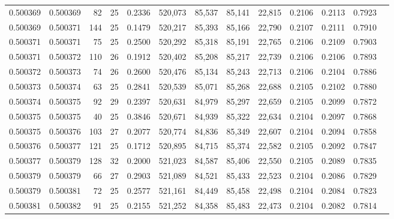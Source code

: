 \begin{tabular}{rrrrrrrrrrrrr}
0.500369 & 0.500369 &  82 &  25 &                                     0.2336 & 520,073 &  85,537 &  85,141 &  22,815 & 0.2106 & 0.2113 & 0.7923 \\
0.500369 & 0.500371 & 144 &  25 &                                     0.1479 & 520,217 &  85,393 &  85,166 &  22,790 & 0.2107 & 0.2111 & 0.7910 \\
0.500371 & 0.500371 &  75 &  25 &                                     0.2500 & 520,292 &  85,318 &  85,191 &  22,765 & 0.2106 & 0.2109 & 0.7903 \\
0.500371 & 0.500372 & 110 &  26 &                                     0.1912 & 520,402 &  85,208 &  85,217 &  22,739 & 0.2106 & 0.2106 & 0.7893 \\
0.500372 & 0.500373 &  74 &  26 &                                     0.2600 & 520,476 &  85,134 &  85,243 &  22,713 & 0.2106 & 0.2104 & 0.7886 \\
0.500373 & 0.500374 &  63 &  25 &                                     0.2841 & 520,539 &  85,071 &  85,268 &  22,688 & 0.2105 & 0.2102 & 0.7880 \\
0.500374 & 0.500375 &  92 &  29 &                                     0.2397 & 520,631 &  84,979 &  85,297 &  22,659 & 0.2105 & 0.2099 & 0.7872 \\
0.500375 & 0.500375 &  40 &  25 &                                     0.3846 & 520,671 &  84,939 &  85,322 &  22,634 & 0.2104 & 0.2097 & 0.7868 \\
0.500375 & 0.500376 & 103 &  27 &                                     0.2077 & 520,774 &  84,836 &  85,349 &  22,607 & 0.2104 & 0.2094 & 0.7858 \\
0.500376 & 0.500377 & 121 &  25 &                                     0.1712 & 520,895 &  84,715 &  85,374 &  22,582 & 0.2105 & 0.2092 & 0.7847 \\
0.500377 & 0.500379 & 128 &  32 &                                     0.2000 & 521,023 &  84,587 &  85,406 &  22,550 & 0.2105 & 0.2089 & 0.7835 \\
0.500379 & 0.500379 &  66 &  27 &                                     0.2903 & 521,089 &  84,521 &  85,433 &  22,523 & 0.2104 & 0.2086 & 0.7829 \\
0.500379 & 0.500381 &  72 &  25 &                                     0.2577 & 521,161 &  84,449 &  85,458 &  22,498 & 0.2104 & 0.2084 & 0.7823 \\
0.500381 & 0.500382 &  91 &  25 &                                     0.2155 & 521,252 &  84,358 &  85,483 &  22,473 & 0.2104 & 0.2082 & 0.7814 \\

\end{tabular}
